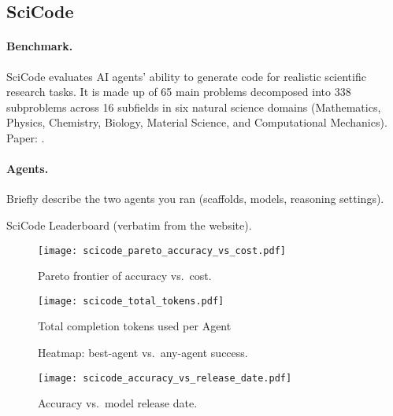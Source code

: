 \subsection{SciCode}\label{app:scicode}

\paragraph{Benchmark.}
SciCode evaluates AI agents' ability to generate code for realistic scientific research tasks. It is made up of 65 main problems decomposed into 338 subproblems across 16 subfields in six natural science domains (Mathematics, Physics, Chemistry, Biology, Material Science, and Computational Mechanics).
Paper: \cite{scicode}.

\paragraph{Agents.}
Briefly describe the two agents you ran (scaffolds, models, reasoning settings).


\begin{table}[t]
  \centering
  \caption{SciCode Leaderboard (verbatim from the website).}
  \label{tab:scicode_full}
  
\end{table}


\begin{figure}[htbp]
  \centering
  \texttt{[image: scicode\_pareto\_accuracy\_vs\_cost.pdf]}
  \caption{Pareto frontier of accuracy vs.\ cost.}
  \label{fig:scicode_pareto}
\end{figure}

\begin{figure}[htbp]
  \centering
  \texttt{[image: scicode\_total\_tokens.pdf]}
  \caption{Total completion tokens used per Agent}
  \label{fig:scicode_tokens}
\end{figure}

\begin{figure*}[t]
  \centering
  \caption{Heatmap: best-agent vs.\ any-agent success.}
  \label{fig:scicode_heatmap}
\end{figure*}

\begin{figure}[htbp]
  \centering
  \texttt{[image: scicode\_accuracy\_vs\_release\_date.pdf]}
  \caption{Accuracy vs.\ model release date.}
  \label{fig:scicode_release}
\end{figure}

\clearpage